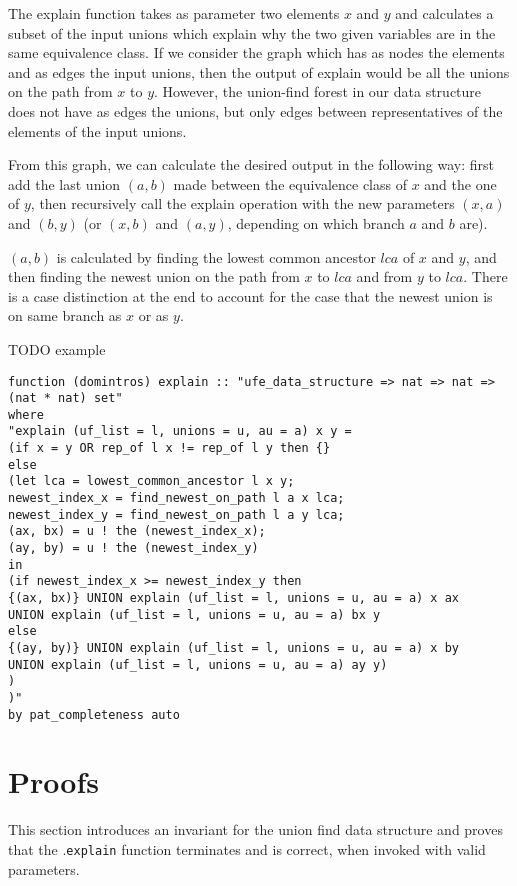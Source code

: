 The explain function takes as parameter two elements $x$ and $y$ and calculates a subset of the input unions which explain why the two given variables are in the same equivalence class. If we consider the graph which has as nodes the elements and as edges the input unions, then the output of explain would be all the unions on the path from $x$ to $y$. However, the union-find forest in our data structure does not have as edges the unions, but only edges between representatives of the elements of the input unions. 

From this graph, we can calculate the desired output in the following way: first add the last union $(a, b)$ made between the equivalence class of $x$ and the one of $y$, then recursively call the explain operation with the new parameters $(x, a)$ and $(b, y)$ (or $(x, b)$ and $(a, y)$, depending on which branch $a$ and $b$ are). 

$(a, b)$ is calculated by finding the lowest common ancestor $lca$ of $x$ and $y$, and then finding the newest union on the path from $x$ to $lca$ and from $y$ to $lca$. There is a case distinction at the end to account for the case that the newest union is on same branch as $x$ or as $y$.

TODO example

\begin{lstlisting}
function (domintros) explain :: "ufe_data_structure => nat => nat => (nat * nat) set"
where
"explain (uf_list = l, unions = u, au = a) x y = 
(if x = y OR rep_of l x != rep_of l y then {}
else 
(let lca = lowest_common_ancestor l x y;
newest_index_x = find_newest_on_path l a x lca;
newest_index_y = find_newest_on_path l a y lca;
(ax, bx) = u ! the (newest_index_x);
(ay, by) = u ! the (newest_index_y)
in
(if newest_index_x >= newest_index_y then
{(ax, bx)} UNION explain (uf_list = l, unions = u, au = a) x ax 
UNION explain (uf_list = l, unions = u, au = a) bx y
else 
{(ay, by)} UNION explain (uf_list = l, unions = u, au = a) x by 
UNION explain (uf_list = l, unions = u, au = a) ay y)
)
)"
by pat_completeness auto
\end{lstlisting}

\section{Proofs}

This section introduces an invariant for the union find data structure and proves
that the .\lstinline{explain} function terminates and is correct, when invoked with valid parameters.

